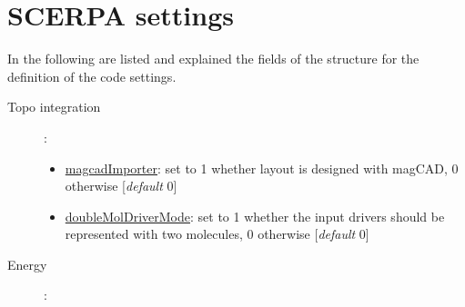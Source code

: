 \documentclass[a4paper,10pt]{article}
\begin{document}
\section{SCERPA settings}
\noindent In the following are listed and explained the fields of the structure for the definition of the code settings.

\begin{description}
\item[Topo integration]:
	\begin{itemize}
	\item \underline{magcadImporter}: set to 1 whether layout is designed with magCAD, 0 otherwise [\textit{default} 0]
	\item \underline{doubleMolDriverMode}: set to 1 whether the input drivers should be represented with two molecules, 0 otherwise [\textit{default} 0]
	\end{itemize}
\item[Energy]:
	\begin{itemize}
		

\end{itemize}
\end{description}
\end{document}
